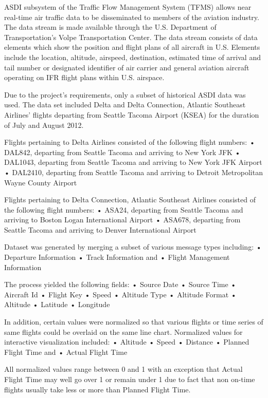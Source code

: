 \documentclass{sig-alternate}
\begin{document}
ASDI subsystem of the Traffic Flow
Management System (TFMS) allows near
real-time air traffic data to be disseminated to
members of the aviation industry. The data stream
is made available through the U.S. Department
of Transportation's Volpe Transportation Center.
The data stream consists of data elements which
show the position and flight plans of all aircraft
in U.S. Elements include the location, altitude,
airspeed, destination, estimated time of arrival and
tail number or designated identifier of air carrier
and general aviation aircraft operating on IFR flight
plans within U.S. airspace.

Due to the project’s requirements, only a
subset of historical ASDI data was used. The data
set included Delta and Delta Connection, Atlantic
Southeast Airlines’ flights departing from Seattle
Tacoma Airport (KSEA) for the duration of July
and August 2012.

Flights pertaining to Delta Airlines consisted
of the following flight numbers:
• DAL842, departing from Seattle Tacoma
and arriving to New York JFK
• DAL1043, departing from Seattle Tacoma
and arriving to New York JFK Airport
• DAL2410, departing from Seattle Tacoma
and arriving to Detroit Metropolitan
Wayne County Airport

Flights pertaining to Delta Connection,
Atlantic Southeast Airlines consisted of the
following flight numbers:
• ASA24, departing from Seattle Tacoma
and arriving to Boston Logan International
Airport
• ASA678, departing from Seattle Tacoma
and arriving to Denver International
Airport

Dataset was generated by merging a subset of
various message types including:
• Departure Information
• Track Information and
• Flight Management Information

The process yielded the following fields:
• Source Date
• Source Time
• Aircraft Id
• Flight Key
• Speed
• Altitude Type
• Altitude Format
• Altitude
• Latitude
• Longitude

In addition, certain values were normalized
so that various flights or time series of same
flights could be overlaid on the same line chart.
Normalized values for interactive visualization
included:
• Altitude
• Speed
• Distance
• Planned Flight Time and
• Actual Flight Time

All normalized values range between 0 and 1
with an exception that Actual Flight Time may
well go over 1 or remain under 1 due to fact
that non on-time flights usually take less or
more than Planned Flight Time.
\end{document}

